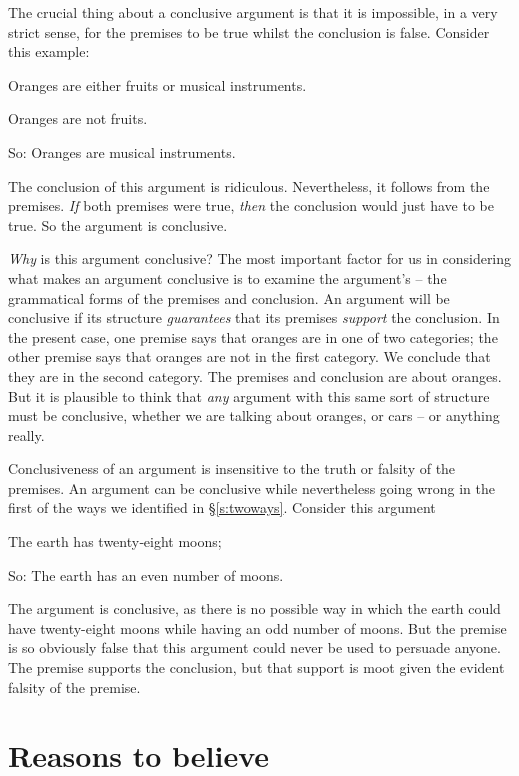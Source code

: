 The crucial thing about a conclusive argument is that it is impossible, in a very strict sense, for the premises to be true whilst the conclusion is false. Consider this example:
	\begin{earg}
		\item[] Oranges are either fruits or musical instruments.
		\item[] Oranges are not fruits.
		\item[So:] Oranges are musical instruments.
	\end{earg}
The conclusion of this argument is ridiculous. Nevertheless, it follows from the premises. \emph{If} both premises were true, \emph{then} the conclusion would just have to be true. So the argument is conclusive. 

\emph{Why} is this argument conclusive? The most important factor for us in considering what makes an argument conclusive is to examine the argument's  – the grammatical forms of the premises and conclusion. An argument will be conclusive if its structure \emph{guarantees} that its premises \emph{support} the conclusion. In the present case, one premise says that oranges are in one of two categories; the other premise says that oranges are not in the first category. We conclude that they are in the second category. The premises and conclusion are about oranges. But it is plausible to think that \emph{any} argument with this same sort of structure must be conclusive, whether we are talking about oranges, or cars – or anything really. 

Conclusiveness of an argument is insensitive to the truth or falsity of the premises. An argument can be conclusive while nevertheless going wrong in the first of the ways we identified in §\ref{s:twoways}. Consider this argument \begin{earg}
	\item[]The earth has twenty‐eight moons;
	\item[So:]The earth has an even number of moons.
\end{earg} The argument is conclusive, as there is no possible way in which the earth could have twenty-eight moons while having an odd number of moons. But the premise is so obviously false that this argument could never be used to persuade anyone. The premise supports the conclusion, but that support is moot given the evident falsity of the premise.

\section{Reasons to believe}\label{ss:reasoning}

